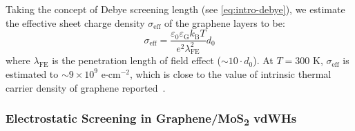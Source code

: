 %
Taking the concept of Debye screening length (see
\autoref{eq:intro-debye}), we estimate the
effective sheet charge density $\sigma_{\mathrm{eff}}$ of the graphene layers to be:
\begin{equation}
\label{eq:asym-debye}
\sigma_{\mathrm{eff}} = \dfrac{\varepsilon_{0} \varepsilon_{\mathrm{G}} k_{\mathrm{B}} T}{e^{2} \lambda_{\mathrm{FE}}^{2}} d_{0}
\end{equation}
where $\lambda_{\mathrm{FE}}$ is the penetration length of field
effect ($\sim{}10\cdot{}d_{0}$). At $T=300$ K, $\sigma_{\mathrm{eff}}$
is estimated to $\sim{}9\times10^{9}$ e$\cdot$cm$^{-2}$, which is
close to the value of intrinsic thermal carrier density of graphene
reported~\cite{Fang_2007_carrier_graphene}.


\subsubsection{Electrostatic Screening in Graphene/MoS\textsubscript{2} vdWHs}
\label{sec:asym-classic}

